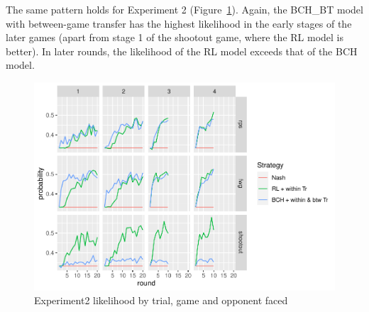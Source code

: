 \documentclass[english,man,floatsintext]{apa6}
\begin{document}
The same pattern holds for Experiment 2 (Figure~\ref{fig:exp2-lik-by-tr}). Again, the BCH\_BT model with between-game transfer has the highest likelihood in the early stages of the later games (apart from stage 1 of the shootout game, where the RL model is better). In later rounds, the likelihood of the RL model exceeds that of the BCH model.

\begin{figure}

{\centering \includegraphics{paper_draft_2021_files/figure-latex/exp2-lik-by-tr-1} 

}

\caption{Experiment2 likelihood by trial, game and opponent faced}\label{fig:exp2-lik-by-tr}
\end{figure}
\end{document}
